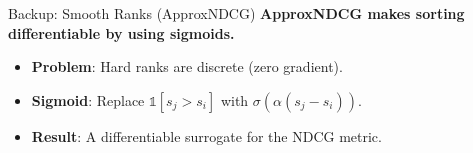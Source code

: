 \documentclass[aspectratio=169]{beamer}
\newif\ifanimated
\newcommand{\cpause}{\ifanimated\pause\fi}
\begin{document}
\appendix
\begin{frame}{Backup: Smooth Ranks (ApproxNDCG)}
\textbf{ApproxNDCG makes sorting differentiable by using sigmoids.}

\vspace{0.8em}
\begin{itemize}
    \item \textbf{Problem}: Hard ranks are discrete (zero gradient).
    \item \textbf{Sigmoid}: Replace $\mathbb{1}[s_j > s_i]$ with $\sigma(\alpha(s_j - s_i))$.
    \item \textbf{Result}: A differentiable surrogate for the NDCG metric.
\end{itemize}\cpause

\vspace{1em}
\cpause
\begin{center}
\end{center}
\end{frame}
\end{document}
